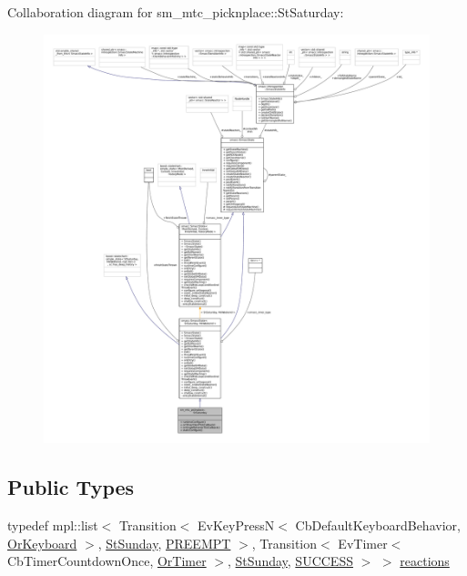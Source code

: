 Collaboration diagram for sm\+\_\+mtc\+\_\+picknplace\+:\+:St\+Saturday\+:
\nopagebreak
\begin{figure}[H]
\begin{center}
\leavevmode
\includegraphics[width=350pt]{structsm__mtc__picknplace_1_1StSaturday__coll__graph}
\end{center}
\end{figure}
\subsection*{Public Types}
\begin{DoxyCompactItemize}
\item 
typedef mpl\+::list$<$ Transition$<$ Ev\+Key\+PressN$<$ Cb\+Default\+Keyboard\+Behavior, \hyperlink{classsm__mtc__picknplace_1_1OrKeyboard}{Or\+Keyboard} $>$, \hyperlink{structsm__mtc__picknplace_1_1StSunday}{St\+Sunday}, \hyperlink{classPREEMPT}{P\+R\+E\+E\+M\+PT} $>$, Transition$<$ Ev\+Timer$<$ Cb\+Timer\+Countdown\+Once, \hyperlink{classsm__mtc__picknplace_1_1OrTimer}{Or\+Timer} $>$, \hyperlink{structsm__mtc__picknplace_1_1StSunday}{St\+Sunday}, \hyperlink{classSUCCESS}{S\+U\+C\+C\+E\+SS} $>$ $>$ \hyperlink{structsm__mtc__picknplace_1_1StSaturday_a12c8103770d6d52191db3690f245cf21}{reactions}
\end{DoxyCompactItemize}
